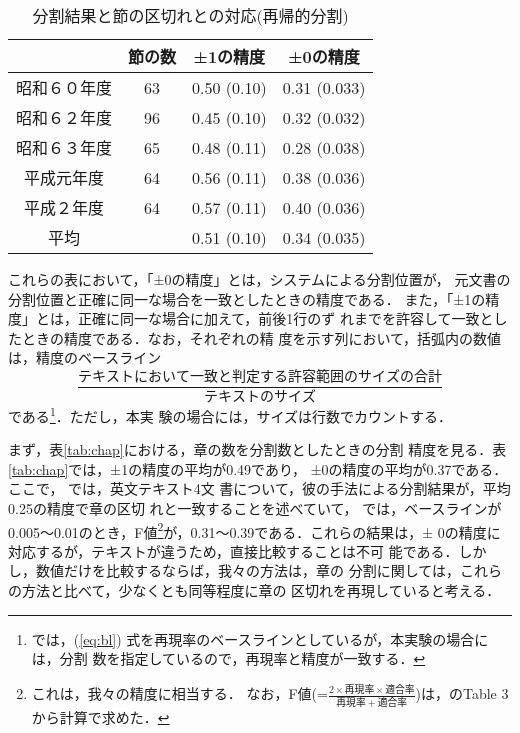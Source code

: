 \begin{table}[htbp]
  \begin{center}
    \caption{分割結果と節の区切れとの対応(再帰的分割)}
    \begin{tabular}{|c|ccc|}\hline
                   & 節の数 & ±1の精度   & ±0の精度\\ \hline
      昭和６０年度 & 63     & 0.50 (0.10) & 0.31 (0.033)\\
      昭和６２年度 & 96     & 0.45 (0.10) & 0.32 (0.032)\\
      昭和６３年度 & 65     & 0.48 (0.11) & 0.28 (0.038)\\
      平成元年度   & 64     & 0.56 (0.11) & 0.38 (0.036)\\
      平成２年度   & 64     & 0.57 (0.11) & 0.40 (0.036)\\\hline
      平均         &        & 0.51 (0.10) & 0.34 (0.035)\\\hline
    \end{tabular}
    \label{tab:secrec}
  \end{center}
\end{table}

これらの表において，「±0の精度」とは，システムによる分割位置が，
元文書の分割位置と正確に同一な場合を一致としたときの精度である．
また，「±1の精度」とは，正確に同一な場合に加えて，前後1行のず
れまでを許容して一致としたときの精度である．なお，それぞれの精
度を示す列において，括弧内の数値は，精度のベースライン
\begin{equation}
  \label{eq:bl}
  \frac{テキストにおいて一致と判定する許容範囲のサイズの合計}{テキストのサイズ}
\end{equation}
である\cite{nakao99}\footnote{\cite{nakao99}では，(\ref{eq:bl})
  式を再現率のベースラインとしているが，本実験の場合には，分割
  数を指定しているので，再現率と精度が一致する．}．ただし，本実
験の場合には，サイズは行数でカウントする．

まず，表\ref{tab:chap}における，章の数を分割数としたときの分割
精度を見る．表\ref{tab:chap}では，±1の精度の平均が0.49であり，
±0の精度の平均が0.37である．ここで，
\cite{reynar99:_statis_model_topic_segmen}では，英文テキスト4文
書について，彼の手法による分割結果が，平均0.25の精度で章の区切
れと一致することを述べていて，
\cite{nakao00:_algor_one_summar_long_text}では，ベースラインが
0.005〜0.01のとき，F値\footnote{これは，我々の精度に相当する．
  なお，F値(=$\frac{2 \times 再現率 \times 適合率}{再現率+適合
    率}$)は，\cite{nakao00:_algor_one_summar_long_text}のTable
  3 から計算で求めた．}が，0.31〜0.39である．これらの結果は，±
0の精度に対応するが，テキストが違うため，直接比較することは不可
能である．しかし，数値だけを比較するならば，我々の方法は，章の
分割に関しては，これらの方法と比べて，少なくとも同等程度に章の
区切れを再現していると考える．

